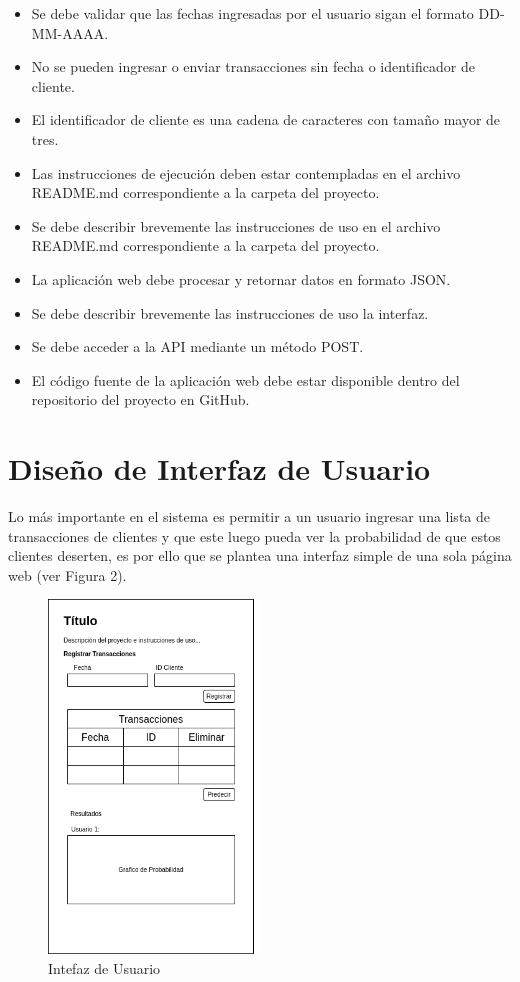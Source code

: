 \begin{itemize}
	\item Se debe validar que las fechas ingresadas por el usuario sigan el formato DD-MM-AAAA.
	\item No se pueden ingresar o enviar transacciones sin fecha o identificador de cliente.
	\item El identificador de cliente es una cadena de caracteres con tamaño mayor de tres.
	\item Las instrucciones de ejecución deben estar contempladas en el archivo README.md correspondiente a la carpeta del proyecto.
	\item Se debe describir brevemente las instrucciones de uso en el archivo README.md correspondiente a la carpeta del proyecto.
	\item La aplicación web debe procesar y retornar datos en formato JSON.
	\item Se debe describir brevemente las instrucciones de uso la interfaz.
	\item Se debe acceder a la API mediante un método POST.
	\item El código fuente de la aplicación web debe estar disponible dentro del repositorio del proyecto en GitHub.
\end{itemize}

\section{Diseño de Interfaz de Usuario}

Lo más importante en el sistema es permitir a un usuario ingresar una lista de transacciones de clientes y que este luego pueda ver la probabilidad de que estos clientes deserten, es por ello que se plantea una interfaz simple de una sola página web (ver Figura 2).

\begin{figure}[H]
	\centering \includegraphics[width=0.50\textwidth]{images/ui.png}
	\caption{Intefaz de Usuario}
	\label{fig:ui}
\end{figure}

